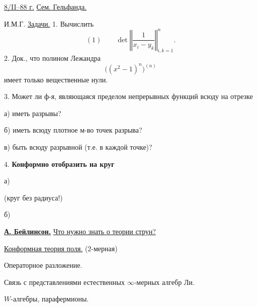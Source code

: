 \underline{8/II--88 г.} \underline{Сем. Гельфанда.}

И.М.Г. \underline{Задачи.} 1. Вычислить
\begin{equation*}
(1)\qquad \det\left\Vert\frac{1}{x_i-y_k}\right\Vert_{i,k=1}^{n}.
\end{equation*}
2. Док., что полином Лежандра
\begin{equation*}
\bigl((x^2-1)^n\bigr)^{(n)}
\end{equation*}
имеет только вещественные нули.

3. Может ли ф-я, являющаяся пределом непрерывных функций всюду на отрезке

а) иметь разрывы?

б) иметь всюду плотное м-во точек разрыва?

в) быть всюду разрывной (т.е. в каждой точке)?

4. \textbf{Конформно отобразить на круг}

а)\quad
{}
\quad (круг без радиуса!)

б)
\begin{center}
\end{center}

\underline{\textbf{А. Бейлинсон.}} \qquad
\underline{Что нужно знать о теории струн?}

\underline{Конформная теория поля.} \qquad (2-мерная)

Операторное разложение.

Связь с представлениями естественных $\infty$-мерных алгебр Ли.

$W$-алгебры, парафермионы.


